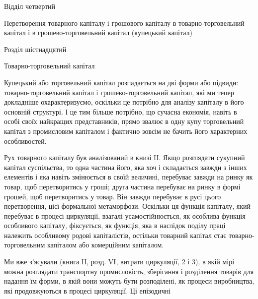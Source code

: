 Відділ четвертий

Перетворення товарного капіталу і грошового
капіталу в товарно-торговельний
капітал і в грошево-торговельний капітал
(купецький капітал)

Розділ шістнадцятий

Товарно-торговельний капітал

Купецький або торговельний капітал розпадається на дві
форми або підвиди: товарно-торговельний капітал і грошево-торговельний
капітал, які ми тепер докладніше охарактеризуємо,
оскільки це потрібно для аналізу капіталу в його основній структурі.
І це тим більше потрібно, що сучасна економія, навіть
в особі своїх найкращих представників, прямо звалює в одну
купу торговельний капітал з промисловим капіталом і фактично
зовсім не бачить його характерних особливостей.

Рух товарного капіталу був аналізований в книзі II. Якщо
розглядати сукупний капітал суспільства, то одна частина
його, яка хоч і складається завжди з інших елементів і яка навіть
змінюється в своїй величині, перебуває завжди на ринку
як товар, щоб перетворитись у гроші; друга частина перебуває
на ринку в формі грошей, щоб перетворитись у товар. Він
завжди перебуває в русі цього перетворення, цієї формальної
метаморфози. Оскільки ця функція капіталу, який перебуває
в процесі циркуляції, взагалі усамостійнюється, як особлива
функція особливого капіталу, фіксується, як функція, яка в наслідок
поділу праці належить особливому родові капіталістів,
остільки товарний капітал стає товарно-торговельним капіталом
або комерційним капіталом.

Ми вже з’ясували (книга II, розд. VI, витрати циркуляції,
2 і 3), в якій мірі можна розглядати транспортну промисловість,
зберігання і розділення товарів для надання їм форми,
в якій вони можуть бути розподілені, як процеси виробництва,
які продовжуються в процесі циркуляції. Ці епізодичні
